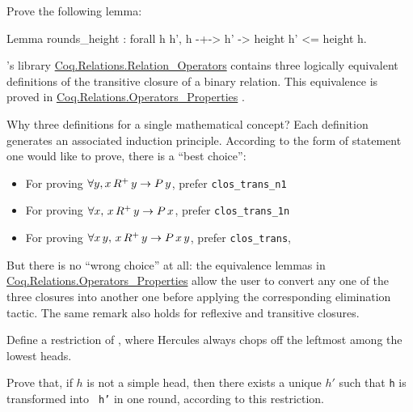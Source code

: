 \documentclass[a4paper]{book}
\begin{document}

\begin{exercise}
Prove the following lemma:

\begin{Coqsrc}
Lemma rounds_height : forall h h', 
   h -+-> h' -> height h' <= height h.  
\end{Coqsrc}
  
\end{exercise}

\begin{remark}
\label{remark:transitive-closure}
\coq's library \href{https://coq.inria.fr/distrib/current/stdlib/Coq.Relations.Relation_Operators.html}{Coq.Relations.Relation\_Operators} 
contains three logically equivalent definitions of the transitive closure of a binary relation. This equivalence is proved in 
\href{https://coq.inria.fr/distrib/current/stdlib/Coq.Relations.Operators_Properties.html}{Coq.Relations.Operators\_Properties} . 

Why three definitions for a single mathematical concept?
Each definition generates an associated induction principle. 
 According to the form of statement one would like to prove, there is a ``best choice'':

\begin{itemize}
\item For proving $\forall y, x\,R^+\,y \;\mbox{$\rightarrow$}\; P\,y$, prefer 
\texttt{clos\_trans\_n1}
\item For proving $\forall x,\,x\,R^+\,y \;\mbox{$\rightarrow$}\; P\,x$, prefer \texttt{clos\_trans\_1n}
\item For proving $\forall x\,y, \,x\,R^+\,y \;\mbox{$\rightarrow$}\;P\,x\,y$,  
prefer \texttt{clos\_trans},
\end{itemize}
But there is no ``wrong choice'' at all: the equivalence lemmas in \linebreak 
\href{https://coq.inria.fr/distrib/current/stdlib/Coq.Relations.Operators_Properties.html}{Coq.Relations.Operators\_Properties} 
 allow the user
to convert any one of the three closures into another one before applying the corresponding elimination tactic.
The same remark also holds for reflexive and transitive closures. 
\end{remark}


\begin{exercise}
Define a restriction of ,  where Hercules always chops off
the leftmost among the lowest heads.

Prove that, if $h$ is not a simple head, then there exists a unique $h'$ such that \texttt{h}  is transformed into \texttt{ h'} in one round, according to this restriction.


\end{exercise}
\end{document}
